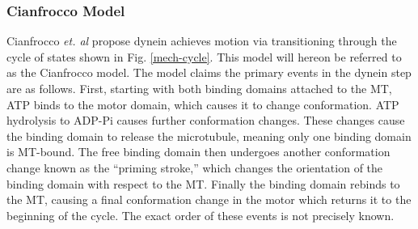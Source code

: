 \documentclass[10pt]{article} %
\begin{document}
\subsubsection{Cianfrocco Model}
Cianfrocco \textit{et. al} \cite{cianfroccoreview} propose dynein achieves motion via transitioning through the cycle of states shown in Fig. \ref{mech-cycle}. This model will hereon be referred to as the Cianfrocco model. The model claims the primary events in the dynein step are as follows. First, starting with both binding domains attached to the MT, ATP binds to the motor domain, which causes it to change conformation. ATP hydrolysis to ADP-Pi causes further conformation changes. These changes cause the binding domain to release the microtubule, meaning only one binding domain is MT-bound. The free binding domain then undergoes another conformation change known as the ``priming stroke,'' which changes the orientation of the binding domain with respect to the MT. Finally the binding domain rebinds to the MT, causing a final conformation change in the motor which returns it to the beginning of the cycle. The exact order of these events is not precisely known.\\
\end{document}
